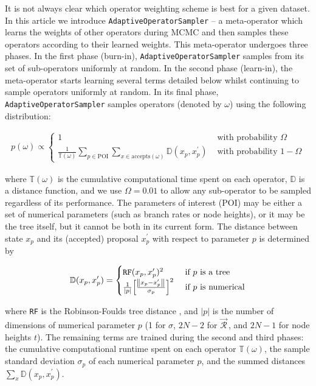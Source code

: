 \documentclass[10pt,letterpaper]{article}
\begin{document}
It is not always clear which operator weighting scheme is best for a given dataset.
In this article we introduce \texttt{AdaptiveOperatorSampler} -- a meta-operator which learns the weights of other operators during MCMC and then samples these operators according to their learned weights.
This meta-operator undergoes three phases.
In the first phase (burn-in), \texttt{AdaptiveOperatorSampler} samples from its set of sub-operators uniformly at random.
In the second phase (learn-in), the meta-operator starts learning several terms detailed below whilst continuing to sample operators uniformly at random.
In its final phase, \texttt{AdaptiveOperatorSampler} samples operators (denoted by $\omega$) using the following distribution:


\begin{align}
\label{eqn:adaptiveSampler}
	p(\omega) \propto \begin{cases} 1 & \text{ with probability } \Omega \\ \frac{1}{\mathbb{T}(\omega)} \sum\limits_{p \in \text{POI}}  \sum\limits_{x \in \text{accepts}(\omega)}  \mathbb{D}(x_p, x_p^\prime) & \text{ with probability } 1-\Omega \end{cases}
\end{align}

\noindent
where $\mathbb{T}(\omega)$ is the cumulative computational time spent on each operator, $\mathbb{D}$ is a distance function, and we use $\Omega = 0.01$ to allow any sub-operator to be sampled regardless of its performance.
The parameters of interest (POI) may be either a set of numerical parameters (such as branch rates or node heights), or it may be the tree itself, but it cannot be both in its current form.
The distance between state $x_p$ and its (accepted) proposal $x_p^\prime$ with respect to parameter $p$ is determined by


\begin{align}
\label{eqn:distanceFunctions} 
	\mathbb{D}(x_p, x_p^\prime) = \begin{cases} \texttt{RF}(x_p, x_p^\prime)^2 & \text{ if } p \text{ is a tree} \\ 
	\frac{1}{|p|} \Big[ \frac{\norm{x_p - x_p^\prime}}{\sigma_p} \Big]^2    & \text{ if } p \text{ is numerical}  \end{cases}
\end{align}


\noindent
where \texttt{RF} is the Robinson-Foulds tree distance \cite{robinson1981comparison}, and $|p|$ is the number of dimensions of numerical parameter $p$ (1 for $\sigma$, $2N-2$ for $\vec{\mathcal{R}}^{\,}$, and $2N-1$ for node heights $t$).
The remaining terms are trained during the second and third phases: the cumulative computational runtime spent on each operator $\mathbb{T}(\omega)$, the sample standard deviation $\sigma_p$ of each numerical parameter $p$, and the summed distances $\sum_x \mathbb{D}(x_p, x_p^\prime)$.
\end{document}
